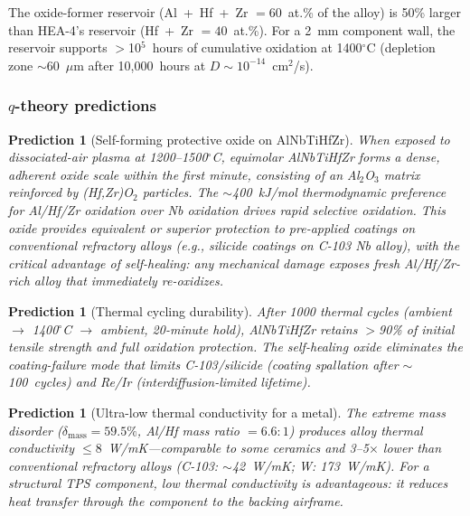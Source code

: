 \documentclass[12pt,letterpaper]{article}
\newtheorem{prediction}[theorem]{Prediction}
\theoremstyle{definition}
\begin{document}
The oxide-former reservoir (Al~+~Hf~+~Zr $= 60$~at.\% of the alloy) is 50\% larger than HEA-4's reservoir (Hf~+~Zr $= 40$~at.\%).  For a 2~mm component wall, the reservoir supports $>$10$^5$~hours of cumulative oxidation at 1400$^\circ$C (depletion zone $\sim$60~$\mu$m after 10,000~hours at $D \sim 10^{-14}$~cm$^2$/s).

\subsubsection{$q$-theory predictions}

\begin{prediction}[Self-forming protective oxide on AlNbTiHfZr]\label{pred:hotstructure_oxide}
When exposed to dissociated-air plasma at 1200--1500$^\circ$C, equimolar AlNbTiHfZr forms a dense, adherent oxide scale within the first minute, consisting of an Al$_2$O$_3$ matrix reinforced by (Hf,Zr)O$_2$ particles.  The $\sim$400~kJ/mol thermodynamic preference for Al/Hf/Zr oxidation over Nb oxidation drives rapid selective oxidation.  This oxide provides equivalent or superior protection to pre-applied coatings on conventional refractory alloys (e.g., silicide coatings on C-103 Nb alloy), with the critical advantage of self-healing: any mechanical damage exposes fresh Al/Hf/Zr-rich alloy that immediately re-oxidizes.
\end{prediction}

\begin{prediction}[Thermal cycling durability]\label{pred:hotstructure_cycling}
After 1000 thermal cycles (ambient $\to$ 1400$^\circ$C $\to$ ambient, 20-minute hold), AlNbTiHfZr retains $>$90\% of initial tensile strength and full oxidation protection.  The self-healing oxide eliminates the coating-failure mode that limits C-103/silicide (coating spallation after $\sim$100~cycles) and Re/Ir (interdiffusion-limited lifetime).
\end{prediction}

\begin{prediction}[Ultra-low thermal conductivity for a metal]\label{pred:hotstructure_conductivity}
The extreme mass disorder ($\delta_{\mathrm{mass}} = 59.5\%$, Al/Hf mass ratio $= 6.6{:}1$) produces alloy thermal conductivity $\leq 8$~W/mK---comparable to some ceramics and 3--5$\times$ lower than conventional refractory alloys (C-103: $\sim$42~W/mK; W: 173~W/mK).  For a structural TPS component, low thermal conductivity is advantageous: it reduces heat transfer through the component to the backing airframe.
\end{prediction}
\end{document}
